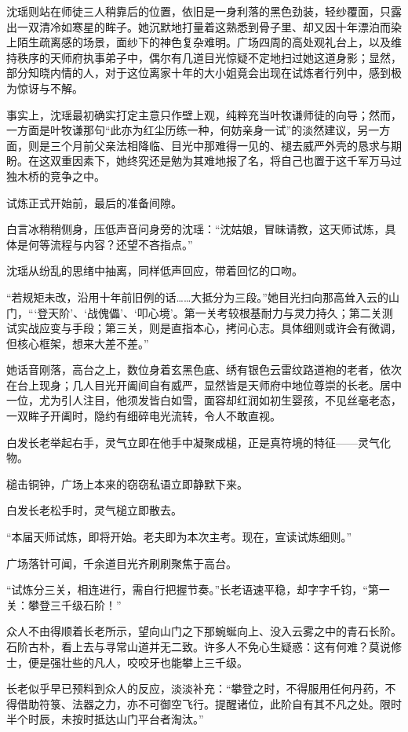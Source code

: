 沈瑶则站在师徒三人稍靠后的位置，依旧是一身利落的黑色劲装，轻纱覆面，只露出一双清冷如寒星的眸子。她沉默地打量着这熟悉到骨子里、却又因十年漂泊而染上陌生疏离感的场景，面纱下的神色复杂难明。广场四周的高处观礼台上，以及维持秩序的天师府执事弟子中，偶尔有几道目光惊疑不定地扫过她这道身影；显然，部分知晓内情的人，对于这位离家十年的大小姐竟会出现在试炼者行列中，感到极为惊讶与不解。

事实上，沈瑶最初确实打定主意只作壁上观，纯粹充当叶牧谦师徒的向导；然而，一方面是叶牧谦那句“此亦为红尘历练一种，何妨亲身一试”的淡然建议，另一方面，则是三个月前父亲法相降临、目光中那难得一见的、褪去威严外壳的恳求与期盼。在这双重因素下，她终究还是勉为其难地报了名，将自己也置于这千军万马过独木桥的竞争之中。

\vspace{2em}

试炼正式开始前，最后的准备间隙。

白言冰稍稍侧身，压低声音问身旁的沈瑶：“沈姑娘，冒昧请教，这天师试炼，具体是何等流程与内容？还望不吝指点。”

沈瑶从纷乱的思绪中抽离，同样低声回应，带着回忆的口吻。

“若规矩未改，沿用十年前旧例的话……大抵分为三段。”她目光扫向那高耸入云的山门，“‘登天阶’、‘战傀儡’、‘叩心境’。第一关考较根基耐力与灵力持久；第二关测试实战应变与手段；第三关，则是直指本心，拷问心志。具体细则或许会有微调，但核心框架，想来大差不差。”

她话音刚落，高台之上，数位身着玄黑色底、绣有银色云雷纹路道袍的老者，依次在台上现身；几人目光开阖间自有威严，显然皆是天师府中地位尊崇的长老。居中一位，尤为引人注目，他须发皆白如雪，面容却红润如初生婴孩，不见丝毫老态，一双眸子开阖时，隐约有细碎电光流转，令人不敢直视。

白发长老举起右手，灵气立即在他手中凝聚成槌，正是真符境的特征——灵气化物。

槌击铜钟，广场上本来的窃窃私语立即静默下来。

白发长老松手时，灵气槌立即散去。

“本届天师试炼，即将开始。老夫即为本次主考。现在，宣读试炼细则。”

广场落针可闻，千余道目光齐刷刷聚焦于高台。

“试炼分三关，相连进行，需自行把握节奏。”长老语速平稳，却字字千钧，“第一关：攀登三千级石阶！”

众人不由得顺着长老所示，望向山门之下那蜿蜒向上、没入云雾之中的青石长阶。石阶古朴，看上去与寻常山道并无二致。许多人不免心生疑惑：这有何难？莫说修士，便是强壮些的凡人，咬咬牙也能攀上三千级。

长老似乎早已预料到众人的反应，淡淡补充：“攀登之时，不得服用任何丹药，不得借助符箓、法器之力，亦不可御空飞行。提醒诸位，此阶自有其不凡之处。限时半个时辰，未按时抵达山门平台者淘汰。”

